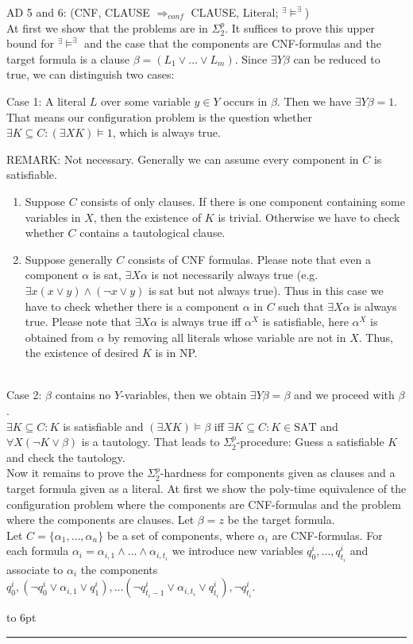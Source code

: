 \documentclass[12pt]{article}
\newcommand{\AMB}{\mbox{$^\exists\!\!\models^\exists$}}
\newenvironment{proof}{\parindent=0pt{\bf Proof: }}{
   \hspace*{\fill}\hbox to 6pt{\leaders\hrule width 6pt height 6pt\hfill}\par}
\begin{document}
\begin{proof}
AD 5 and 6: (CNF, CLAUSE $\Longrightarrow_{conf}$ CLAUSE, Literal; \AMB)\\
At first we show that the problems are in $\Sigma^p_2$. It suffices to prove this upper bound for \AMB
and the case that the components are CNF-formulas and the target formula is a clause
$\beta =(L_1 \vee \ldots \vee L_m)$. Since $\exists Y \beta$ can be reduced to true, we can distinguish two cases:

Case 1: A literal $L$ over some variable $y \in Y$ occurs in $\beta$. Then we have $\exists Y \beta = 1$. That means our configuration problem is the question whether
$\exists K \subseteq C: (\exists X K) \models 1$, which is always true.

\color{red} REMARK:
Not necessary. Generally we can assume every component in $C$ is satisfiable.
\begin{enumerate}
\item Suppose $C$ consists of only clauses. If there is one component containing some variables in $X$, then the existence of $K$ is trivial.  Otherwise we have to check whether $C$ contains a tautological clause.
\item Suppose generally $C$ consists of CNF formulas. Please note that even a component $\alpha$ is sat, $\exists X\alpha$ is not necessarily always true (e.g. $\exists x (x\vee y)\wedge (\neg x\vee y)$ is sat but not always true). Thus in this case we have to check whether there is a component $\alpha$ in $C$ such that $\exists X\alpha$ is always true. Please note that $\exists X\alpha$ is always true iff $\alpha^{X}$ is satisfiable, here $\alpha^{X}$ is obtained from $\alpha$ by removing all literals whose variable are not in $X$. Thus, the existence of desired $K$ is in NP.
\end{enumerate}
\color{black}
\ \ \\

Case 2: $\beta$ contains no $Y$-variables, then we obtain $\exists Y \beta = \beta$ and we proceed with $\beta$.\\
$\exists K \subseteq C: K$ is satisfiable and $(\exists X K) \models \beta$ iff
$\exists K \subseteq C: K \in %
{\mbox{SAT}}$ and $\forall X (\neg K \vee \beta)$ is a tautology.
That leads to $\Sigma^p_2$-procedure: Guess a satisfiable $K$ and check the tautology.\\

Now it remains to prove the $\Sigma^p_2$-hardness for components given  as clauses and a target formula given as a literal.
At first we show the poly-time equivalence of the configuration problem where the components are CNF-formulas and
the problem where the components are clauses.
Let $\beta=z$ be the target formula.\\
Let $C=\{\alpha_1, \ldots, \alpha_n\}$ be a set of components, where $\alpha_i$ are CNF-formulas.
For each formula $\alpha_i= \alpha_{i,1} \wedge \ldots \wedge \alpha_{i,t_i}$  we introduce new variables $q^i_0, \ldots, q^i_{t_i}$ and associate to $\alpha_i$ the components $q^i_0, (\neg q^i_0 \vee \alpha_{i,1} \vee q^i_1), \ldots
(\neg q^i_{t_i-1} \vee \alpha_{i,t_i} \vee q^i_{t_i}), \neg q^i_{t_i}$.


\end{proof}
\end{document}
